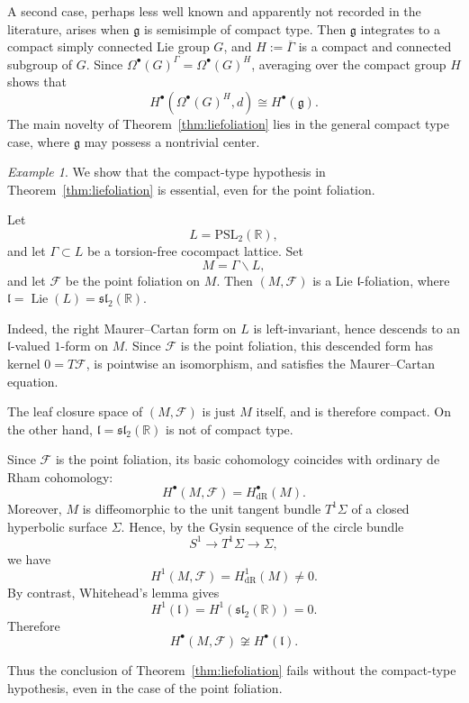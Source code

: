 \documentclass[reqno, 11pt]{amsart}
\theoremstyle{definition}
\theoremstyle{property}
\theoremstyle{remark}
\newtheorem{ex}[thm]{Example}
\numberwithin{equation}{section}
\begin{document}
A second case, perhaps less well known and apparently not recorded in the
literature, arises when $\mathfrak g$ is semisimple of compact type. Then
$\mathfrak g$ integrates to a compact simply connected Lie group $G$, and
$H:=\overline{\Gamma}$ is a compact and connected subgroup of $G$. Since
$\Omega^\bullet(G)^\Gamma=\Omega^\bullet(G)^H$, averaging over the compact group
$H$ shows that
\[
H^\bullet(\Omega^\bullet(G)^H,d)\cong H^\bullet(\mathfrak g).
\]
The main novelty of Theorem~\ref{thm:liefoliation} lies in the general compact
type case, where $\mathfrak g$ may possess a nontrivial center.

\begin{ex}
We show that the compact-type hypothesis in
Theorem~\ref{thm:liefoliation} is essential, even for the point foliation.

Let
\[
L=\mathrm{PSL}_2(\mathbb R),
\]
and let $\Gamma\subset L$ be a torsion-free cocompact lattice. Set
\[
M=\Gamma\backslash L,
\]
and let $\mathcal F$ be the point foliation on $M$. Then $(M,\mathcal F)$ is a Lie $\mathfrak l$-foliation, where
$
\mathfrak l=\operatorname{Lie}(L)=\mathfrak{sl}_2(\mathbb R)$. 

Indeed, the right Maurer--Cartan form on $L$ is left-invariant, hence descends
to an $\mathfrak l$-valued $1$-form on $M$. Since $\mathcal F$ is the point
foliation, this descended form has kernel $0=T\mathcal F$, is pointwise an
isomorphism, and satisfies the Maurer--Cartan equation.

The leaf closure space of $(M,\mathcal F)$ is just $M$ itself, and is therefore
compact. On the other hand, $\mathfrak l=\mathfrak{sl}_2(\mathbb R)$ is not of
compact type.

Since $\mathcal F$ is the point foliation, its basic cohomology coincides with
ordinary de Rham cohomology:
\[
H^\bullet(M,\mathcal F)=H^\bullet_{\mathrm{dR}}(M).
\]
Moreover, $M$ is diffeomorphic to the unit tangent bundle $T^1\Sigma$ of a
closed hyperbolic surface $\Sigma$. Hence, by the Gysin sequence of the circle
bundle
\[
S^1\longrightarrow T^1\Sigma\longrightarrow \Sigma,
\]
we have
\[
H^1(M,\mathcal F)=H^1_{\mathrm{dR}}(M)\neq 0.
\]
By contrast, Whitehead's lemma gives
\[
H^1(\mathfrak l)=H^1(\mathfrak{sl}_2(\mathbb R))=0.
\]
Therefore
\[
H^\bullet(M,\mathcal F)\not\cong H^\bullet(\mathfrak l).
\]

Thus the conclusion of Theorem~\ref{thm:liefoliation} fails without the
compact-type hypothesis, even in the case of the point foliation.
\end{ex}
\end{document}
